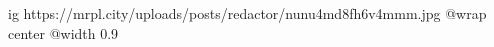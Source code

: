  
 
 
 
 

\ifcmt
  ig https://mrpl.city/uploads/posts/redactor/nunu4md8fh6v4mmm.jpg
  @wrap center
  @width 0.9
\fi
